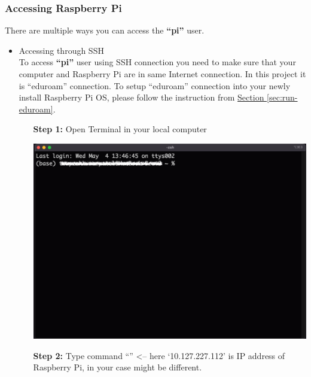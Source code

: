 	\subsubsection{Accessing Raspberry Pi}	\label{subsubsec:ssh}
		There are multiple ways you can access the \textbf{``pi''} user.  
		\begin{itemize}[leftmargin=1.2cm]
			\item Accessing through SSH \\
				To access \textbf{``pi''} user using SSH connection you need to make sure that your computer and Raspberry Pi are in same Internet connection. In this project it is ``eduroam'' connection. To setup ``eduroam'' connection into your newly install Raspberry Pi OS, please follow the instruction from \hyperref[sec:run-eduroam]{Section \ref{sec:run-eduroam}}.
				\begin{itemize}[leftmargin=1.3cm]
					\item[\textbf{Step 1:}] Open Terminal in your local computer \\
						\begin{minipage}{\textwidth}
							\vspace{2mm}
							\includegraphics[scale=0.35]{Images/raspberry_pi/ssh_login/open_iterm.png}
							\vspace{2mm}
						\end{minipage}
					\item[\textbf{Step 2:}] Type command ``{\selectfont{ssh pi@10.127.227.112}}'' <-- here `10.127.227.112' is IP address of Raspberry Pi, in your case might be different.\\
						\begin{minipage}{\textwidth}

\end{minipage}
\end{itemize}
\end{itemize}
